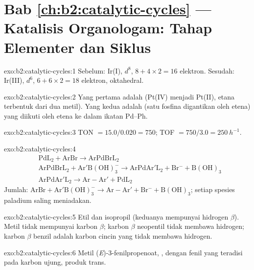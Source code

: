 \section*{Bab \ref{ch:b2:catalytic-cycles} --- Katalisis Organologam: Tahap Elementer dan Siklus}

\begin{solution}{exo:b2:catalytic-cycles:1}
Sebelum: Ir(I), $d^8$, $8 + 4 \times 2 = 16$ elektron. Sesudah: Ir(III), $d^6$, $6 + 6 \times 2 = 18$
elektron, oktahedral.
\end{solution}

\begin{solution}{exo:b2:catalytic-cycles:2}
Yang pertama adalah  (Pt(IV) menjadi Pt(II), etana
terbentuk dari dua metil). Yang kedua adalah  (satu fosfina
digantikan oleh etena) yang diikuti oleh  etena ke dalam
ikatan Pd--Ph.
\end{solution}

\begin{solution}{exo:b2:catalytic-cycles:3}
TON $= 15.0/0.020 = 750$; TOF $= 750/3.0 = \qty{250}{h^{-1}}$.
\end{solution}

\begin{solution}{exo:b2:catalytic-cycles:4}
\begin{align*}
  &\mathrm{PdL_2 + ArBr \to ArPdBrL_2}\\
  &\mathrm{ArPdBrL_2 + Ar'B(OH)_3^- \to ArPdAr'L_2 + Br^- + B(OH)_3}\\
  &\mathrm{ArPdAr'L_2 \to Ar{-}Ar' + PdL_2}
\end{align*}
Jumlah: $\mathrm{ArBr + Ar'B(OH)_3^- \to Ar{-}Ar' + Br^- + B(OH)_3}$; setiap
spesies paladium saling meniadakan.
\end{solution}

\begin{solution}{exo:b2:catalytic-cycles:5}
Etil dan isopropil (keduanya mempunyai hidrogen $\beta$). Metil tidak mempunyai karbon $\beta$;
karbon $\beta$ neopentil tidak membawa hidrogen; karbon $\beta$ benzil adalah karbon cincin
 yang tidak membawa hidrogen.
\end{solution}

\begin{solution}{exo:b2:catalytic-cycles:6}
Metil (\textit{E})-3-fenilpropenoat, , dengan fenil yang
teradisi pada karbon ujung, produk trans.
\end{solution}

